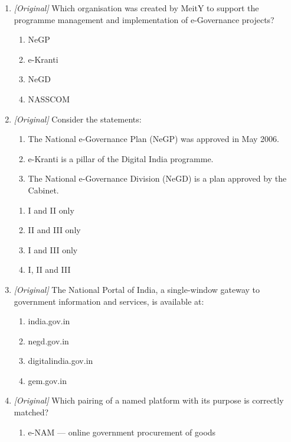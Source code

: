 \begin{enumerate}[label=\textbf{Q\arabic*.}, leftmargin=*]
\begin{enumerate}[label=\Alph*.]
    \item Pillar 5 of Digital India and the upgraded National e-Governance
      Plan (NeGP 2.0)
    \item the portal for online government procurement
  \end{enumerate}
\item \textit{[Original]} Which organisation was created by MeitY to support
  the programme management and implementation of e-Governance projects?
  \begin{enumerate}[label=\Alph*.]
    \item NeGP
    \item e-Kranti
    \item NeGD
    \item NASSCOM
  \end{enumerate}
\item \textit{[Original]} Consider the statements:
  \begin{enumerate}[label=\Roman*.]
    \item The National e-Governance Plan (NeGP) was approved in May 2006.
    \item e-Kranti is a pillar of the Digital India programme.
    \item The National e-Governance Division (NeGD) is a plan approved by
      the Cabinet.
  \end{enumerate}
  \begin{enumerate}[label=\Alph*.]
    \item I and II only
    \item II and III only
    \item I and III only
    \item I, II and III
  \end{enumerate}
\item \textit{[Original]} The National Portal of India, a single-window
  gateway to government information and services, is available at:
  \begin{enumerate}[label=\Alph*.]
    \item india.gov.in
    \item negd.gov.in
    \item digitalindia.gov.in
    \item gem.gov.in
  \end{enumerate}
\item \textit{[Original]} Which pairing of a named platform with its purpose
  is correctly matched?
  \begin{enumerate}[label=\Alph*.]
    \item e-NAM --- online government procurement of goods

\end{enumerate}
\end{enumerate}
